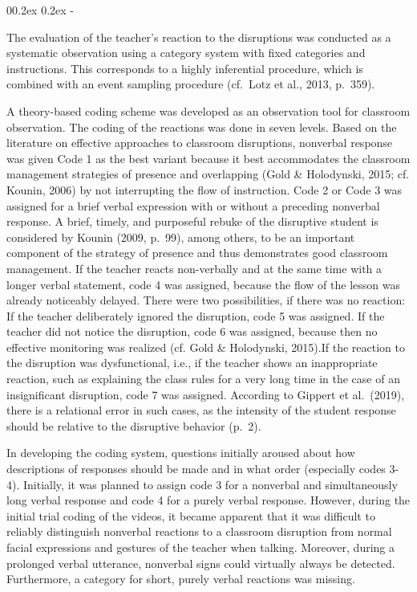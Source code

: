 \documentclass[
  man]{apa6}
\makeatletter
\let\oldsubparagraph\subparagraph
\renewcommand{\subparagraph}{
    \@ifstar
      \xxxSubParagraphStar
      \xxxSubParagraphNoStar
  }
\newcommand{\xxxSubParagraphStar}[1]{\oldsubparagraph*{#1}\mbox{}}
\newcommand{\xxxSubParagraphNoStar}[1]{\oldsubparagraph{#1}\mbox{}}
\renewcommand{\subparagraph}[1]{\@startsection{subparagraph}{5}{1em}%
  {0\baselineskip \@plus 0.2ex \@minus 0.2ex}%
  {-\z@\relax}%
  {\normalfont\normalsize\itshape\hspace{\parindent}{#1}\textit{\addperi}}{\relax}}
\makeatother
\begin{document}
\subparagraph{Teachers' Reaction to disruptions}\label{teachers-reaction-to-disruptions}

The evaluation of the teacher's reaction to the disruptions was conducted as a systematic observation using a category system with fixed categories and instructions. This corresponds to a highly inferential procedure, which is combined with an event sampling procedure (cf.~Lotz et al., 2013, p.~359).

A theory-based coding scheme was developed as an observation tool for classroom observation. The coding of the reactions was done in seven levels. Based on the literature on effective approaches to classroom disruptions, nonverbal response was given Code 1 as the best variant because it best accommodates the classroom management strategies of presence and overlapping (Gold \& Holodynski, 2015; cf. Kounin, 2006) by not interrupting the flow of instruction. Code 2 or Code 3 was assigned for a brief verbal expression with or without a preceding nonverbal response. A brief, timely, and purposeful rebuke of the disruptive student is considered by Kounin (2009, p.~99), among others, to be an important component of the strategy of presence and thus demonstrates good classroom management. If the teacher reacts non-verbally and at the same time with a longer verbal statement, code 4 was assigned, because the flow of the lesson was already noticeably delayed. There were two possibilities, if there was no reaction: If the teacher deliberately ignored the disruption, code 5 was assigned. If the teacher did not notice the disruption, code 6 was assigned, because then no effective monitoring was realized (cf. Gold \& Holodynski, 2015).If the reaction to the disruption was dysfunctional, i.e., if the teacher shows an inappropriate reaction, such as explaining the class rules for a very long time in the case of an insignificant disruption, code 7 was assigned. According to Gippert et al.~(2019), there is a relational error in such cases, as the intensity of the student response should be relative to the disruptive behavior (p.~2).

In developing the coding system, questions initially aroused about how descriptions of responses should be made and in what order (especially codes 3-4). Initially, it was planned to assign code 3 for a nonverbal and simultaneously long verbal response and code 4 for a purely verbal response. However, during the initial trial coding of the videos, it became apparent that it was difficult to reliably distinguish nonverbal reactions to a classroom disruption from normal facial expressions and gestures of the teacher when talking. Moreover, during a prolonged verbal utterance, nonverbal signs could virtually always be detected. Furthermore, a category for short, purely verbal reactions was missing.
\end{document}
